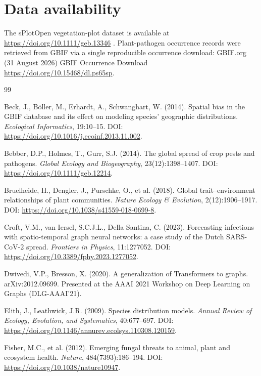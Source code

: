 \documentclass[a4paper,fleqn]{cas-sc}
\begin{document}
\section*{Data availability}
The sPlotOpen vegetation-plot dataset is available at \url{https://doi.org/10.1111/geb.13346} \citep{sabatini2021}. Plant-pathogen occurrence records were retrieved from GBIF via a single reproducible occurrence download: GBIF.org (31 August 2026) GBIF Occurrence Download \url{https://doi.org/10.15468/dl.ps65sp}.

\begin{thebibliography}{99}

 Beck, J., B\"oller, M., Erhardt, A., Schwanghart, W. (2014). Spatial bias in the GBIF database and its effect on modeling species' geographic distributions. \textit{Ecological Informatics}, 19:10--15. DOI: \url{https://doi.org/10.1016/j.ecoinf.2013.11.002}.

 Bebber, D.P., Holmes, T., Gurr, S.J. (2014). The global spread of crop pests and pathogens. \textit{Global Ecology and Biogeography}, 23(12):1398--1407. DOI: \url{https://doi.org/10.1111/geb.12214}.

 Bruelheide, H., Dengler, J., Purschke, O., et al. (2018). Global trait--environment relationships of plant communities. \textit{Nature Ecology \& Evolution}, 2(12):1906--1917. DOI: \url{https://doi.org/10.1038/s41559-018-0699-8}.

 Croft, V.M., van Iersel, S.C.J.L., Della Santina, C. (2023). Forecasting infections with spatio-temporal graph neural networks: a case study of the Dutch SARS-CoV-2 spread. \textit{Frontiers in Physics}, 11:1277052. DOI: \url{https://doi.org/10.3389/fphy.2023.1277052}.

 Dwivedi, V.P., Bresson, X. (2020). A generalization of Transformers to graphs. arXiv:2012.09699. Presented at the AAAI 2021 Workshop on Deep Learning on Graphs (DLG-AAAI'21).

 Elith, J., Leathwick, J.R. (2009). Species distribution models. \textit{Annual Review of Ecology, Evolution, and Systematics}, 40:677--697. DOI: \url{https://doi.org/10.1146/annurev.ecolsys.110308.120159}.

 Fisher, M.C., et al. (2012). Emerging fungal threats to animal, plant and ecosystem health. \textit{Nature}, 484(7393):186--194. DOI: \url{https://doi.org/10.1038/nature10947}.


\end{thebibliography}
\end{document}
